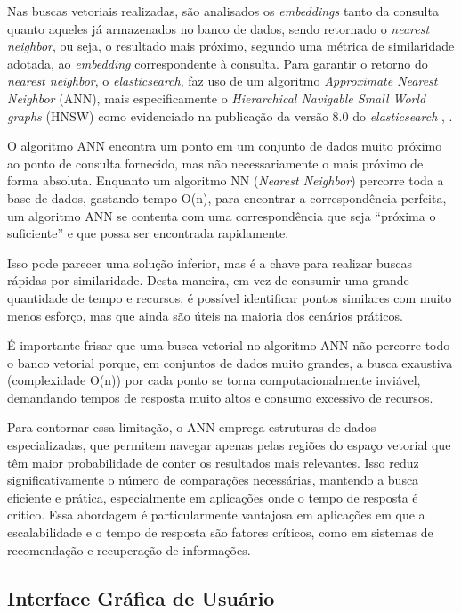 \documentclass[a4paper, 12pt]{article}
\newcommand{\citeb}[1]{\bibleftbracket\cite{#1}\bibrightbracket}
\begin{document}
    Nas buscas vetoriais realizadas, são analisados os \textit{embeddings} tanto da consulta quanto aqueles já armazenados no banco de dados, sendo retornado o \textit{nearest neighbor}, ou seja, o resultado mais próximo, segundo uma métrica de similaridade adotada, ao \textit{embedding} correspondente à consulta. Para garantir o retorno do \textit{nearest neighbor}, o \textit{elasticsearch}, faz uso de um algoritmo \textit{Approximate Nearest Neighbor} (ANN), mais especificamente o \textit{Hierarchical Navigable Small World graphs} (HNSW) como evidenciado na publicação da versão $8.0$ do \textit{elasticsearch} , \citeb{hsnw}.
    
    O algoritmo ANN encontra um ponto em um conjunto de dados muito próximo ao ponto de consulta fornecido, mas não necessariamente o mais próximo de forma absoluta. Enquanto um algoritmo NN (\textit{Nearest Neighbor}) percorre toda a base de dados, gastando tempo O(n), para encontrar a correspondência perfeita, um algoritmo ANN se contenta com uma correspondência que seja ``próxima o suficiente'' e que possa ser encontrada rapidamente. 
    
    Isso pode parecer uma solução inferior, mas é a chave para realizar buscas rápidas por similaridade. Desta maneira, em vez de consumir uma grande quantidade de tempo e recursos, é possível identificar pontos similares com muito menos esforço, mas que ainda são úteis na maioria dos cenários práticos.
    
    É importante frisar que uma busca vetorial no algoritmo ANN não percorre todo o banco vetorial porque, em conjuntos de dados muito grandes, a busca exaustiva (complexidade O(n)) por cada ponto se torna computacionalmente inviável, demandando tempos de resposta muito altos e consumo excessivo de recursos. 
    
    Para contornar essa limitação, o ANN emprega estruturas de dados especializadas, que permitem navegar apenas pelas regiões do espaço vetorial que têm maior probabilidade de conter os resultados mais relevantes. Isso reduz significativamente o número de comparações necessárias, mantendo a busca eficiente e prática, especialmente em aplicações onde o tempo de resposta é crítico. Essa abordagem é particularmente vantajosa em aplicações em que a escalabilidade e o tempo de resposta são fatores críticos, como em sistemas de recomendação e recuperação de informações.
    

    \subsection{Interface Gráfica de Usuário}
    
\end{document}
